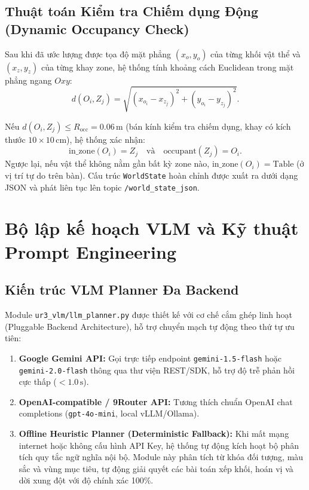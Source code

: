 \documentclass[a4paper,12pt]{article}
\begin{document}
\subsection{Thuật toán Kiểm tra Chiếm dụng Động (Dynamic Occupancy Check)}
Sau khi đã ước lượng được tọa độ mặt phẳng $(x_o, y_o)$ của từng khối vật thể và $(x_z, y_z)$ của từng khay zone, hệ thống tính khoảng cách Euclidean trong mặt phẳng ngang $Oxy$:
\begin{equation}
d(O_i, Z_j) = \sqrt{(x_{o_i} - x_{z_j})^2 + (y_{o_i} - y_{z_j})^2}.
\end{equation}

Nếu $d(O_i, Z_j) \le R_{\text{occ}} = 0.06\,\text{m}$ (bán kính kiểm tra chiếm dụng, khay có kích thước $10\times 10\,\text{cm}$), hệ thống xác nhận:
\begin{equation}
\text{in\_zone}(O_i) = Z_j \quad \text{và} \quad \text{occupant}(Z_j) = O_i.
\end{equation}
Ngược lại, nếu vật thể không nằm gần bất kỳ zone nào, $\text{in\_zone}(O_i) = \text{Table}$ (ở vị trí tự do trên bàn). Cấu trúc \texttt{WorldState} hoàn chỉnh được xuất ra dưới dạng JSON và phát liên tục lên topic \texttt{/world\_state\_json}.

\section{Bộ lập kế hoạch VLM và Kỹ thuật Prompt Engineering}

\subsection{Kiến trúc VLM Planner Đa Backend}
Module \texttt{ur3_vlm/llm_planner.py} được thiết kế với cơ chế cắm ghép linh hoạt (Pluggable Backend Architecture), hỗ trợ chuyển mạch tự động theo thứ tự ưu tiên:
\begin{enumerate}
    \item \textbf{Google Gemini API:} Gọi trực tiếp endpoint \texttt{gemini-1.5-flash} hoặc \texttt{gemini-2.0-flash} thông qua thư viện REST/SDK, hỗ trợ độ trễ phản hồi cực thấp ($< 1.0\,\text{s}$).
    \item \textbf{OpenAI-compatible / 9Router API:} Tương thích chuẩn OpenAI chat completions (\texttt{gpt-4o-mini}, local vLLM/Ollama).
    \item \textbf{Offline Heuristic Planner (Deterministic Fallback):} Khi mất mạng internet hoặc không cấu hình API Key, hệ thống tự động kích hoạt bộ phân tích quy tắc ngữ nghĩa nội bộ. Module này phân tích từ khóa đối tượng, màu sắc và vùng mục tiêu, tự động giải quyết các bài toán xếp khối, hoán vị và dời xung đột với độ chính xác 100\%.
\end{enumerate}
\end{document}
